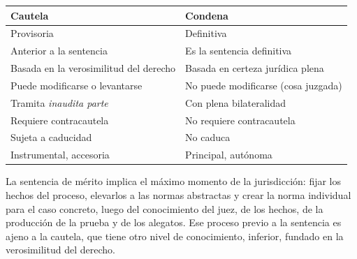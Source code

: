 \documentclass[12pt,oneside]{book}
\begin{document}
\begin{table}[H]
\centering
\begin{tabularx}{\textwidth}{>{\raggedright\arraybackslash}p{} Y}
\toprule
\textbf{Cautela} & \textbf{Condena} \\
\midrule
Provisoria & Definitiva \\
Anterior a la sentencia & Es la sentencia definitiva \\
Basada en la verosimilitud del derecho & Basada en certeza jurídica plena \\
Puede modificarse o levantarse & No puede modificarse (cosa juzgada) \\
Tramita \textit{inaudita parte} & Con plena bilateralidad \\
Requiere contracautela & No requiere contracautela \\
Sujeta a caducidad & No caduca \\
Instrumental, accesoria & Principal, autónoma \\
\bottomrule
\end{tabularx}
\end{table}

La sentencia de mérito implica el máximo momento de la jurisdicción: fijar los hechos del proceso, elevarlos a las normas abstractas y crear la norma individual para el caso concreto, luego del conocimiento del juez, de los hechos, de la producción de la prueba y de los alegatos. Ese proceso previo a la sentencia es ajeno a la cautela, que tiene otro nivel de conocimiento, inferior, fundado en la verosimilitud del derecho.
\end{document}
